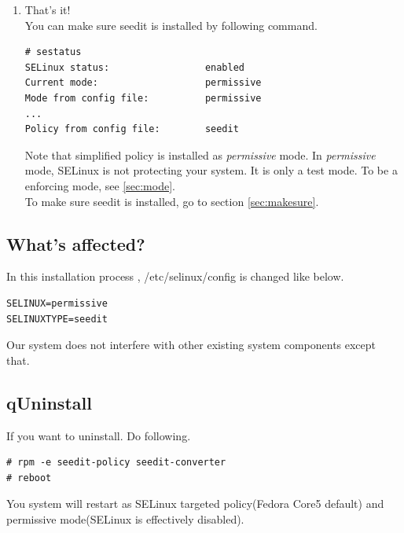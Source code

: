 \documentclass{article}
\begin{document}
\begin{enumerate}
 \item That's it!\\
You can make sure seedit is installed by following command.
\begin{verbatim}
# sestatus
SELinux status:                 enabled
Current mode:                   permissive
Mode from config file:          permissive
...
Policy from config file:        seedit
\end{verbatim}
Note that simplified policy is installed as {\it permissive} mode.
In {\it permissive} mode, SELinux is not protecting your system. It is
 only a test mode. To be a enforcing mode, see \ref{sec:mode}.\\
To make sure seedit is installed, go to section \ref{sec:makesure}.
\end{enumerate}

 \subsection{What's affected?}
 In this installation process ,
/etc/selinux/config is changed like below.
\begin{verbatim}
SELINUX=permissive	
SELINUXTYPE=seedit
\end{verbatim}
Our system does not interfere with other existing system components
except that.
\subsection{qUninstall}
If you want to uninstall. Do following.
\begin{verbatim}
# rpm -e seedit-policy seedit-converter	
# reboot
\end{verbatim}
You system will restart as SELinux targeted policy(Fedora Core5 default)
and permissive mode(SELinux is effectively disabled).
\end{document}
